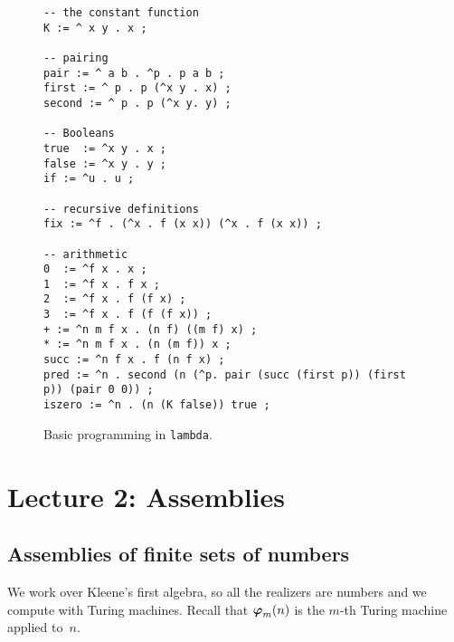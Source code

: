 \documentclass{article}
\begin{document}
\begin{figure}[htp]
  \centering
\begin{lstlisting}
-- the constant function
K := ^ x y . x ;

-- pairing
pair := ^ a b . ^p . p a b ;
first := ^ p . p (^x y . x) ;
second := ^ p . p (^x y. y) ;

-- Booleans
true  := ^x y . x ;
false := ^x y . y ;
if := ^u . u ;

-- recursive definitions
fix := ^f . (^x . f (x x)) (^x . f (x x)) ;

-- arithmetic
0  := ^f x . x ;
1  := ^f x . f x ;
2  := ^f x . f (f x) ;
3  := ^f x . f (f (f x)) ;
+ := ^n m f x . (n f) ((m f) x) ;
* := ^n m f x . (n (m f)) x ;
succ := ^n f x . f (n f x) ;
pred := ^n . second (n (^p. pair (succ (first p)) (first p)) (pair 0 0)) ;
iszero := ^n . (n (K false)) true ;
\end{lstlisting}
  \caption{Basic programming in \texttt{lambda}.}
  \label{fig:lambda}
\end{figure}


\section{Lecture 2: Assemblies}
\label{sec:assemblies}

\subsection{Assemblies of finite sets of numbers}
\label{sec:assembl-finite-sets}

We work over Kleene's first algebra, so all the realizers are numbers and we compute with Turing machines.
Recall that $\text{\boldmath{$\varphi$}}_{m}(n)$ is the $m$-th Turing machine applied to~$n$.
\end{document}
